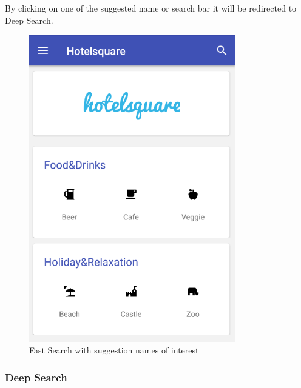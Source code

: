  By clicking on one of the suggested name or search bar it will be redirected to Deep Search.
\begin{figure}[htbp]
	\includegraphics[width=0.8\textwidth]{images/fastsearch.png}
	\centering
	\caption{Fast Search with suggestion names of interest}\label{fig:fastsearch}
\end{figure} 
\subsubsection{Deep Search}

